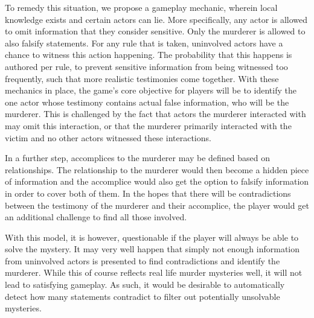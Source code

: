 To remedy this situation, we propose a gameplay mechanic, wherein local knowledge exists and certain actors can lie.
More specifically, any actor is allowed to omit information that they consider sensitive.
Only the murderer is allowed to also falsify statements.
For any rule that is taken, uninvolved actors have a chance to witness this action happening.
The probability that this happens is authored per rule, to prevent sensitive information from being witnessed too frequently, such that more realistic testimonies come together.
With these mechanics in place, the game's core objective for players will be to identify the one actor whose testimony contains actual false information, who will be the murderer.
This is challenged by the fact that actors the murderer interacted with may omit this interaction, or that the murderer primarily interacted with the victim and no other actors witnessed these interactions.

In a further step, accomplices to the murderer may be defined based on relationships.
The relationship to the murderer would then become a hidden piece of information and the accomplice would also get the option to falsify information in order to cover both of them.
In the hopes that there will be contradictions between the testimony of the murderer and their accomplice, the player would get an additional challenge to find all those involved.

With this model, it is however, questionable if the player will always be able to solve the mystery.
It may very well happen that simply not enough information from uninvolved actors is presented to find contradictions and identify the murderer.
While this of course reflects real life murder mysteries well, it will not lead to satisfying gameplay.
As such, it would be desirable to automatically detect how many statements contradict to filter out potentially unsolvable mysteries.

